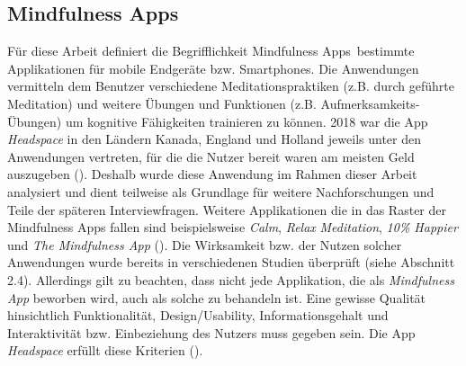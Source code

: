 \documentclass[10pt]{article}
\newcommand{\zit}[1]{(\cite{#1})}
\begin{document}
\subsection{Mindfulness Apps}
Für diese Arbeit definiert die Begrifflichkeit  \grqq Mindfulness Apps\grqq\ bestimmte Applikationen für mobile Endgeräte bzw. Smartphones. Die Anwendungen vermitteln dem Benutzer verschiedene Meditationspraktiken (z.B. durch geführte Meditation) und weitere Übungen und Funktionen (z.B. Aufmerksamkeits-Übungen) um kognitive Fähigkeiten trainieren zu können. 2018 war die App \textit{Headspace} in den Ländern Kanada, England und Holland jeweils unter den Anwendungen vertreten, für die die Nutzer bereit waren am meisten Geld auszugeben \zit{SteigendeNutzung}. Deshalb wurde diese Anwendung im Rahmen dieser Arbeit analysiert und dient teilweise als Grundlage für weitere Nachforschungen und Teile der späteren Interviewfragen. 
Weitere Applikationen die in das Raster der Mindfulness Apps fallen sind beispielsweise \textit{Calm}, \textit{Relax} \textit{Meditation}, \textit{10\% Happier} und\textit{ The Mindfulness App }\zit{VergleichApps}. Die Wirksamkeit bzw. der Nutzen solcher Anwendungen wurde bereits in verschiedenen Studien überprüft (siehe Abschnitt 2.4). Allerdings gilt zu beachten, dass nicht jede Applikation, die als \textit{Mindfulness App} beworben wird, auch als solche zu behandeln ist. Eine gewisse Qualität hinsichtlich Funktionalität, Design/Usability, Informationsgehalt und Interaktivität bzw. Einbeziehung des Nutzers muss gegeben sein. Die App \textit{Headspace} erfüllt diese Kriterien \zit{KriterienApp}.
\end{document}
